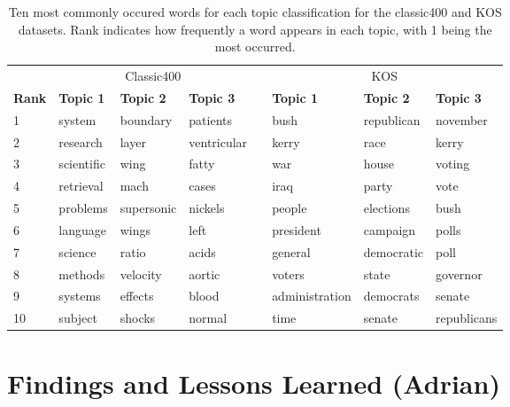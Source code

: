 \documentclass[10pt]{article}
\newcommand{\ra}[1]{\renewcommand{\arraystretch}{#1}}
\begin{document}
\begin{table}[t]
	\centering
    \ra{1.2}
	\begin{tabular}{@{} l l l l c l l l @{}}
        \toprule
        & \multicolumn{3}{c}{Classic400} & \phantom{abc} & \multicolumn{3}{c}{KOS}\\
        \cmidrule{2-4} \cmidrule{6-8}
        \bf{Rank} & \bf{Topic 1} & \bf{Topic 2} & \bf{Topic 3} && \bf{Topic 1} & \bf{Topic 2} & \bf{Topic 3} \\
        \midrule
         1 & system     & boundary      & patients      && bush             & republican    & november \\
         2 & research   & layer         & ventricular   && kerry            & race          & kerry \\
         3 & scientific & wing          & fatty         && war              & house         & voting \\
         4 & retrieval  & mach          & cases         && iraq             & party         & vote \\
         5 & problems   & supersonic    & nickels       && people           & elections     & bush \\
         6 & language   & wings         & left          && president        & campaign      & polls \\
         7 & science    & ratio         & acids         && general          & democratic    & poll \\
         8 & methods    & velocity      & aortic        && voters           & state         & governor \\ 
         9 & systems    & effects       & blood         && administration   & democrats     & senate \\
        10 & subject    & shocks        & normal        && time             & senate        & republicans \\
        \bottomrule
	\end{tabular}
	\caption{Ten most commonly occured words for each topic classification for the classic400 and KOS datasets. Rank indicates how frequently a word appears in each topic, with 1 being the most occurred.}
	\label{tab:most_common}
\end{table}



\section{Findings and Lessons Learned (Adrian)}
\label{sec:conclusion}
\end{document}
